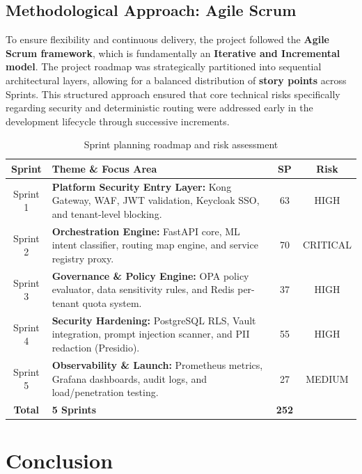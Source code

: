 \subsection{Methodological Approach: Agile Scrum}
To ensure flexibility and continuous delivery, the project followed the \textbf{Agile Scrum framework}, which is fundamentally an \textbf{Iterative and Incremental model}. The project roadmap was strategically partitioned into sequential architectural layers, allowing for a balanced distribution of \textbf{story points} across Sprints. This structured approach ensured that core technical risks specifically regarding security and deterministic routing were addressed early in the development lifecycle through successive increments.

\begin{table}[H]
\centering
\renewcommand{\arraystretch}{1.4}
\begin{tabularx}{\textwidth}{| c | >{\raggedright\arraybackslash}X | c | c |}
\hline
\rowcolor{rowgray}
\textbf{Sprint} & \textbf{Theme \& Focus Area} & \textbf{SP} & \textbf{Risk} \\
\hline
Sprint 1 & \textbf{Platform Security Entry Layer:} Kong Gateway, WAF, JWT validation, Keycloak SSO, and tenant-level blocking. & 63 & HIGH \\
\hline
Sprint 2 & \textbf{Orchestration Engine:} FastAPI core, ML intent classifier, routing map engine, and service registry proxy. & 70 & CRITICAL \\
\hline
Sprint 3 & \textbf{Governance \& Policy Engine:} OPA policy evaluator, data sensitivity rules, and Redis per-tenant quota system. & 37 & HIGH \\
\hline
Sprint 4 & \textbf{Security Hardening:} PostgreSQL RLS, Vault integration, prompt injection scanner, and PII redaction (Presidio). & 55 & HIGH \\
\hline
Sprint 5 & \textbf{Observability \& Launch:} Prometheus metrics, Grafana dashboards, audit logs, and load/penetration testing. & 27 & MEDIUM \\
\hline
\rowcolor{rowgray!50}
\textbf{Total} & \textbf{5 Sprints} & \textbf{252} & \\
\hline
\end{tabularx}
\caption{Sprint planning roadmap and risk assessment}
\label{tab:sprint_roadmap}
\end{table}


\section*{Conclusion}

